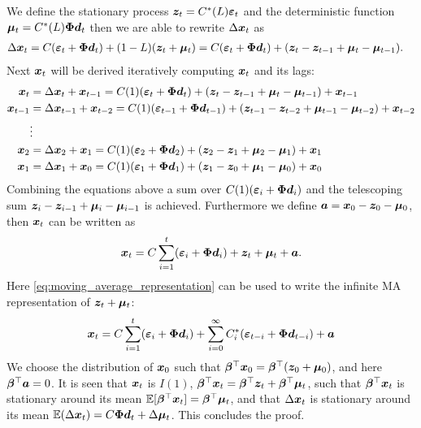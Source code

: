 \begin{bevis}
\noindent We define the stationary process $\boldsymbol{z}_t=C^\ast (L)\boldsymbol{\varepsilon}_t$ and the deterministic function $\boldsymbol{\mu}_t=C^\ast(L)\boldsymbol{\Phi} \boldsymbol{d}_t$ then we are able to rewrite $\Delta \boldsymbol{x}_t$ as
    \begin{align*}
        \Delta \boldsymbol{x}_t&=C(\boldsymbol{\varepsilon}_t+\boldsymbol{\Phi} \boldsymbol{d}_t)+(1-L)(\boldsymbol{z}_t+\boldsymbol{\mu}_t)=C(\boldsymbol{\varepsilon}_t+\boldsymbol{\Phi} \boldsymbol{d}_t)+(\boldsymbol{z}_t-\boldsymbol{z}_{t-1}+\boldsymbol{\mu}_t-\boldsymbol{\mu}_{t-1}).
        \end{align*}
        Next $\boldsymbol{x}_t$ will be derived iteratively computing $\boldsymbol{x}_t$ and its lags:
        \begin{align*}
    \boldsymbol{x}_t&=\Delta \boldsymbol{x}_t+\boldsymbol{x}_{t-1}=C(1)(\boldsymbol{\varepsilon}_t+\boldsymbol{\Phi} \boldsymbol{d}_t)+(\boldsymbol{z}_t-\boldsymbol{z}_{t-1}+\boldsymbol{\mu}_t-\boldsymbol{\mu}_{t-1})+\boldsymbol{x}_{t-1} \\
     \boldsymbol{x}_{t-1}&=\Delta \boldsymbol{x}_{t-1}+\boldsymbol{x}_{t-2}=C(1)(\boldsymbol{\varepsilon}_{t-1}+\boldsymbol{\Phi} \boldsymbol{d}_{t-1})+(\boldsymbol{z}_{t-1}-\boldsymbol{z}_{t-2}+\boldsymbol{\mu}_{t-1}-\boldsymbol{\mu}_{t-2})+\boldsymbol{x}_{t-2}\\
     &\vdots\\
     \boldsymbol{x}_2&=\Delta \boldsymbol{x}_2+\boldsymbol{x}_{1}=C(1)(\boldsymbol{\varepsilon}_2+\boldsymbol{\Phi} \boldsymbol{d}_2)+(\boldsymbol{z}_2-\boldsymbol{z}_{1}+\boldsymbol{\mu}_2-\boldsymbol{\mu}_{1})+\boldsymbol{x}_{1} \\
     \boldsymbol{x}_1&=\Delta \boldsymbol{x}_1+\boldsymbol{x}_{0}=C(1)(\boldsymbol{\varepsilon}_1+\boldsymbol{\Phi} \boldsymbol{d}_1)+(\boldsymbol{z}_1-\boldsymbol{z}_{0}+\boldsymbol{\mu}_1-\boldsymbol{\mu}_{0})+\boldsymbol{x}_{0}
    \end{align*}
    Combining the equations above a sum over $C(1)(\boldsymbol{\varepsilon}_i+\boldsymbol{\Phi} \boldsymbol{d}_i)$ and the telescoping sum $\boldsymbol{z}_i-\boldsymbol{z}_{i-1}+\boldsymbol{\mu}_i-\boldsymbol{\mu}_{i-1}$ is achieved. Furthermore we define $\boldsymbol{a}=\boldsymbol{x}_0-\boldsymbol{z}_0-\boldsymbol{\mu}_0$, then $\boldsymbol{x}_t$ can be written as
\begin{align}
    \boldsymbol{x}_t=C\sum^{t}_{i=1}(\boldsymbol{\varepsilon}_i+\boldsymbol{\Phi} \boldsymbol{d}_i)+\boldsymbol{z}_t+\boldsymbol{\mu}_t+\boldsymbol{a}.
\end{align}
Here \eqref{eq:moving_average_representation} can be used to write the infinite MA representation of $\boldsymbol{z}_t+\boldsymbol{\mu}_t$:
\begin{align}
    \boldsymbol{x}_t=C\sum^{t}_{i=1}(\boldsymbol{\varepsilon}_i+\boldsymbol{\Phi} \boldsymbol{d}_i)+\sum_{i=0}^{\infty}C^\ast_i(\boldsymbol{\varepsilon}_{t-i}+\boldsymbol{\Phi} \boldsymbol{d}_{t-i})+\boldsymbol{a}
\end{align} 
We choose the distribution of $\boldsymbol{x}_0$ such that $\boldsymbol{\beta}^{\top}\boldsymbol{x}_0=\boldsymbol{\beta}^\top(\boldsymbol{z}_0+\boldsymbol{\mu}_0)$, and here $\boldsymbol{\beta}^\top \boldsymbol{a}=0$. It is seen that $\boldsymbol{x}_t$ is $I(1)$, $\boldsymbol{\beta}^\top \boldsymbol{x}_t=\boldsymbol{\beta}^{\top}\boldsymbol{z}_t+\boldsymbol{\beta}^\top \boldsymbol{\mu}_t$, such that $\boldsymbol{\beta}^\top \boldsymbol{x}_t$ is stationary around its mean $\mathbb{E}[\boldsymbol{\beta}^{\top} \boldsymbol{x}_t]=\boldsymbol{\beta}^{\top} \boldsymbol{\mu}_t$, and that $\Delta \boldsymbol{x}_t$ is stationary around its mean $\mathbb{E}(\Delta \boldsymbol{x}_t) =C\boldsymbol{\Phi} \boldsymbol{d}_t +\Delta\boldsymbol{\mu}_t$. This concludes the proof.

\end{bevis}





